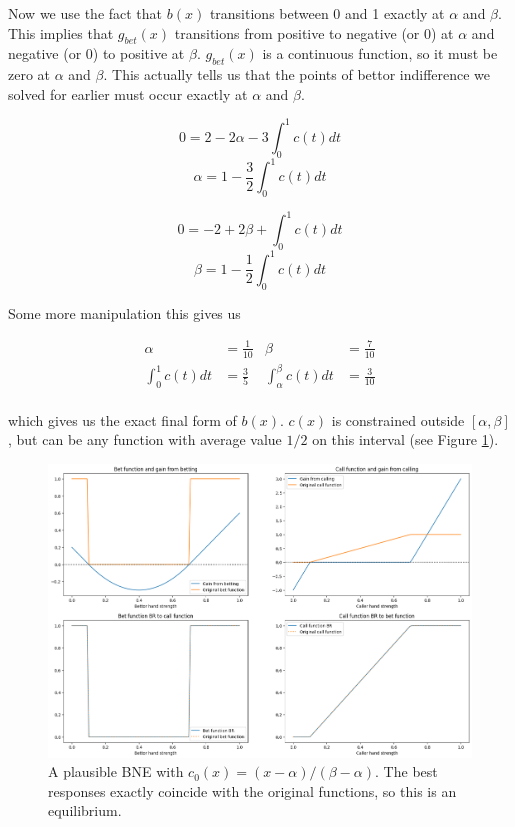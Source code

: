 \documentclass[a4paper,12pt]{article}
\begin{document}
Now we use the fact that $b(x)$ transitions between 0 and 1 exactly at $\alpha$ and $\beta$. This implies that $g_{bet}(x)$ transitions from positive to negative (or 0) at $\alpha$ and negative (or 0) to positive at $\beta$. $g_{bet}(x)$ is a continuous function, so it must be zero at $\alpha$ and $\beta$. This actually tells us that the points of bettor indifference we solved for earlier must occur exactly at $\alpha$ and $\beta$. 

\[ 0  = 2 - 2\alpha - 3 \int_{0}^{1} c(t) dt\]
\[	\alpha =  1- \frac{3}{2} \int_{0}^{1} c(t) dt \]

\[ 0 = -2 + 2\beta + \int_{0}^{1}c(t) dt \]
\[ \beta = 1 - \frac{1}{2}\int_{0}^{1}c(t) dt \]

Some more manipulation this gives us

\begin{align*}
    \alpha & = \frac{1}{10} & \beta & = \frac{7}{10} \\
    \int_{0}^{1} c(t)dt & = \frac{3}{5} & \int_{\alpha}^{\beta} c(t)dt & = \frac{3}{10} \\
\end{align*}

which gives us the exact final form of $b(x)$. $c(x)$ is constrained outside $[\alpha, \beta]$, but can be any function with average value $1/2$ on this interval (see Figure \ref{BNE}).

\begin{figure}[h]
    \begin{center}
    \includegraphics*[scale=0.4]{../BNE.png}
    \caption{A plausible BNE with $c_0(x) = (x-\alpha)/(\beta-\alpha)$. The best responses exactly coincide with the original functions, so this is an equilibrium.}
    \label{BNE}
    \end{center}
\end{figure}
\end{document}
